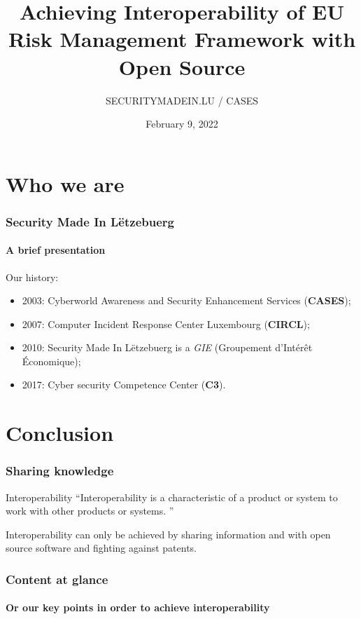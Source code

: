 \documentclass[]{beamer}
\title[EU Risk Management Framework]{Achieving Interoperability of EU Risk Management Framework with Open Source}
\author[Team CASES]{SECURITYMADEIN.LU / CASES}
\institute[]{\href{https://www.cases.lu}{Cyberworld Awareness and Security Enhancements Services}}
\date{February 9, 2022}
\begin{document}
\begin{frame}
  \titlepage
\end{frame}


%
%
\section*{Who we are}
\begin{frame}
  \frametitle{Security Made In Lëtzebuerg}
  \framesubtitle{A brief presentation}
  Our history:
  \begin{center}
    \begin{itemize}
      \item 2003: Cyberworld Awareness and Security Enhancement Services (\textbf{CASES});
      \item 2007: Computer Incident Response Center Luxembourg (\textbf{CIRCL});
      \item 2010: Security Made In Lëtzebuerg is a \textit{GIE} (Groupement d’Intérêt Économique);
      \item 2017: Cyber security Competence Center (\textbf{C3}).
    \end{itemize}
  \end{center}
\end{frame}


\section*{Conclusion}
\begin{frame}
  \frametitle{Sharing knowledge}
  \begin{block}{Interoperability}
    \textquotedblleft Interoperability is a characteristic of a product or system to work with other products or systems. \textquotedblright
  \end{block}
  \bigskip
  \begin{center}
    Interoperability can only be achieved by sharing information and with open source software and fighting against patents.
  \end{center}
\end{frame}


\setcounter{tocdepth}{1}
\begin{frame}
  \frametitle{Content at glance}
  \framesubtitle{Or our key points in order to achieve interoperability}
  \tableofcontents
\end{frame}
\setcounter{tocdepth}{4}
\end{document}
